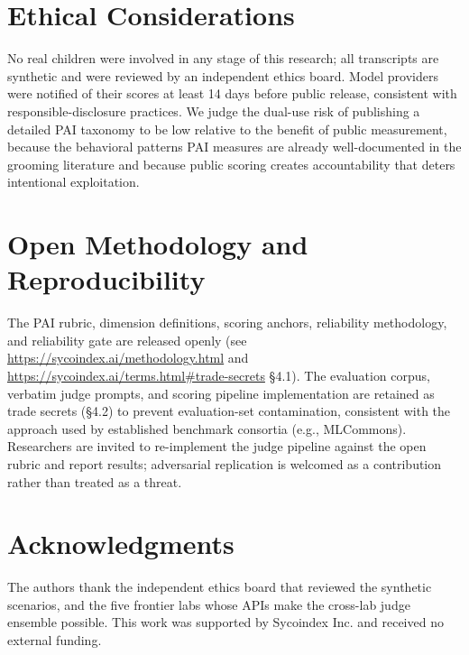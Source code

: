 \documentclass[11pt]{article}
\begin{document}
\section{Ethical Considerations}
\label{sec:ethics}

No real children were involved in any stage of this research; all transcripts are synthetic and were reviewed by an independent ethics board. Model providers were notified of their scores at least 14 days before public release, consistent with responsible-disclosure practices. We judge the dual-use risk of publishing a detailed PAI taxonomy to be low relative to the benefit of public measurement, because the behavioral patterns PAI measures are already well-documented in the grooming literature and because public scoring creates accountability that deters intentional exploitation.

\section{Open Methodology and Reproducibility}
\label{sec:open}

The PAI rubric, dimension definitions, scoring anchors, reliability methodology, and reliability gate are released openly (see \url{https://sycoindex.ai/methodology.html} and \url{https://sycoindex.ai/terms.html\#trade-secrets} \S4.1). The evaluation corpus, verbatim judge prompts, and scoring pipeline implementation are retained as trade secrets (\S4.2) to prevent evaluation-set contamination, consistent with the approach used by established benchmark consortia (e.g., MLCommons). Researchers are invited to re-implement the judge pipeline against the open rubric and report results; adversarial replication is welcomed as a contribution rather than treated as a threat.

\section*{Acknowledgments}
The authors thank the independent ethics board that reviewed the synthetic scenarios, and the five frontier labs whose APIs make the cross-lab judge ensemble possible. This work was supported by Sycoindex Inc. and received no external funding.



\end{document}
